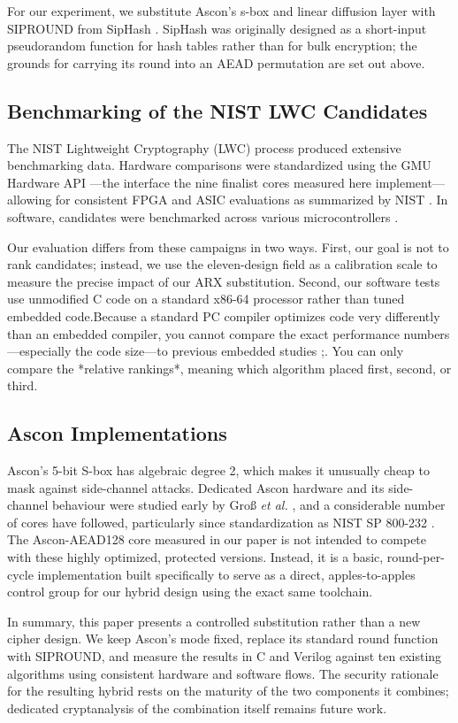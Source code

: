 For our experiment, we substitute Ascon's s-box and linear diffusion layer with SIPROUND from SipHash \cite{siphash}. SipHash was originally designed as a short-input pseudorandom function for hash tables rather than for bulk encryption; the grounds for carrying its round into an AEAD permutation are set out above.

\subsection{Benchmarking of the NIST LWC Candidates}
The NIST Lightweight Cryptography (LWC) process produced extensive benchmarking data. Hardware comparisons were standardized using the GMU Hardware API \cite{lwc-api}---the interface the nine finalist cores measured here implement---allowing for consistent FPGA \cite{mohajerani} and ASIC \cite{aagaard} evaluations as summarized by NIST \cite{nist-lwc-report, nist-lwc-final}. In software, candidates were benchmarked across various microcontrollers \cite{renner,weatherley}. 

Our evaluation differs from these campaigns in two ways. First, our goal is not to rank candidates; instead, we use the eleven-design field as a calibration scale to measure the precise impact of our ARX substitution. Second, our software tests use unmodified C code on a standard x86-64 processor rather than tuned embedded code.Because a standard PC compiler optimizes code very differently than an embedded compiler, you cannot compare the exact performance numbers—especially the code size—to previous embedded studies \cite{renner,weatherley};. You can only compare the *relative rankings*, meaning which algorithm placed first, second, or third.

\subsection{Ascon Implementations}
Ascon's 5-bit S-box has algebraic degree 2, which makes it unusually cheap to mask against side-channel attacks. Dedicated Ascon hardware and its side-channel behaviour were studied early by Gro\ss{} \emph{et al.} \cite{gross}, and a considerable number of cores have followed, particularly since standardization as NIST SP 800-232 \cite{nist-sp800-232}. The Ascon-AEAD128 core measured in our paper is not intended to compete with these highly optimized, protected versions. Instead, it is a basic, round-per-cycle implementation built specifically to serve as a direct, apples-to-apples control group for our hybrid design using the exact same toolchain.


In summary, this paper presents a controlled substitution rather than a new cipher design. We keep Ascon's mode fixed, replace its standard round function with SIPROUND, and measure the results in C and Verilog against ten existing algorithms using consistent hardware and software flows. The security rationale for the resulting hybrid rests on the maturity of the two components it combines; dedicated cryptanalysis of the combination itself remains future work.